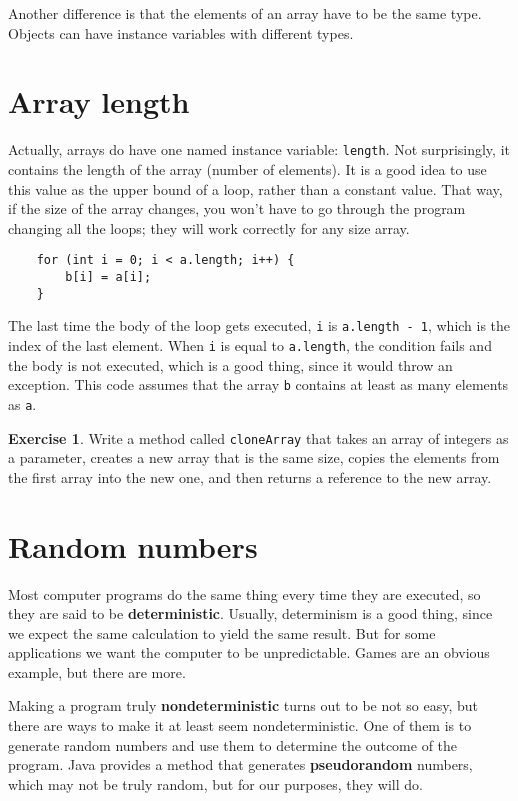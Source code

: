 \documentclass[12pt]{book}
\theoremstyle{definition}
\newtheorem{excz}{Exercise}[chapter]
\newenvironment{exercise}{\bigskip\begin{excz}\mbox{}}{\end{excz}}
\begin{document}
Another difference is that the
elements of an array have to be the same type.  Objects can
have instance variables with different types.


\section{Array length}

Actually, arrays do have one named instance variable: {\tt length}.
Not surprisingly, it contains the length of the array (number
of elements).  It is a good idea to use this value as the upper
bound of a loop, rather than a constant value.  That way, if
the size of the array changes, you won't have to go through the
program changing all the loops; they will work correctly for any
size array.

\begin{lstlisting}
    for (int i = 0; i < a.length; i++) {
        b[i] = a[i];
    }
\end{lstlisting}
%
The last time the body of the loop gets executed, {\tt i}
is {\tt a.length - 1}, which is the index of the last element.  When
{\tt i} is equal to {\tt a.length}, the condition fails and the body
is not executed, which is a good thing, since it would throw an
exception.  This code assumes that the array {\tt b} contains at least
as many elements as {\tt a}.

\begin{exercise}
Write a method called {\tt cloneArray} that takes an
array of integers as a parameter, creates a new array that is the same
size, copies the elements from the first array into the new one, and
then returns a reference to the new array.
\end{exercise}


\section{Random numbers}
\label{random}
\label{pseudorandom}

Most computer programs do the same thing every time they are executed,
so they are said to be {\bf deterministic}.  Usually, determinism is a
good thing, since we expect the same calculation to yield the same
result.  But for some applications we want the
computer to be unpredictable.  Games are an obvious example, but
there are more.

Making a program truly {\bf nondeterministic} turns out to be not so
easy, but there are ways to make it at least seem nondeterministic.
One of them is to generate random numbers and use them to determine
the outcome of the program.  Java provides a method that generates
{\bf pseudorandom} numbers, which may not be truly random, but for our
purposes, they will do.
\end{document}
